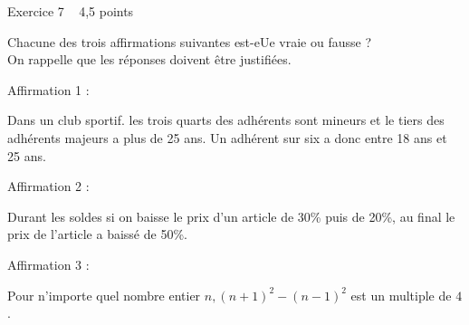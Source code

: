 
%
\begin{h2}Exercice 7   4,5 points\end{h2}
Chacune des trois affirmations suivantes est-eUe vraie ou fausse ? 
\\
On rappelle que les réponses doivent être justifiées.
\par
\begin{h3}Affirmation 1 :\end{h3}
Dans un club sportif. les trois quarts des adhérents sont mineurs et le tiers des adhérents majeurs a plus de 25 ans. Un adhérent sur six a donc entre 18 ans et 25 ans.
\begin{h3}Affirmation 2 :\end{h3}
Durant les soldes si on baisse le prix d'un article de 30\% puis de 20\%, au final le prix de l'article a baissé de 50\%.
\begin{h3}Affirmation 3 :\end{h3}
Pour n'importe quel nombre entier $n, \left(n+1\right)^{2}-\left(n-1\right)^{2}$ est un multiple de $4$.
\par
